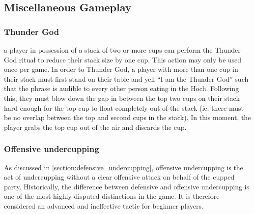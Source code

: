 \documentclass[12pt]{IEEEconf}
\begin{document}
\subsection{Miscellaneous Gameplay}
\subsubsection{Thunder God} a player in possession of a stack of two or more cups can perform the Thunder God ritual to reduce their stack size by one cup. This action may only be used once per game. In order to Thunder God, a player with more than one cup in their stack must first stand on their table and yell ``I am the Thunder God'' such that the phrase is audible to every other person eating in the Hoch. Following this, they must blow down the gap in between the top two cups on their stack hard enough for the top cup to float completely out of the stack (ie. there must be no overlap between the top and second cups in the stack). In this moment, the player grabs the top cup out of the air and discards the cup.

\subsubsection{Offensive undercupping} As discussed in \ref{section:defensive_undercupping}, offensive undercupping is the act of undercupping without a clear offensive attack on behalf of the cupped party. Historically, the difference between defensive and offensive undercupping is one of the most highly disputed distinctions in the game. It is therefore considered an advanced and ineffective tactic for beginner players.
\end{document}
